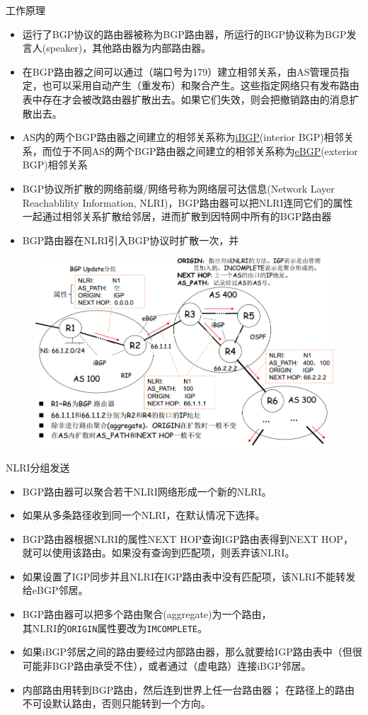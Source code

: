 \myhline
工作原理
\begin{itemize}
\item 运行了BGP协议的路由器被称为BGP路由器，所运行的BGP协议称为BGP发言人(speaker)，其他路由器为内部路由器。
\item 在BGP路由器之间可以通过（端口号为179）建立相邻关系，由AS管理员指定，也可以采用自动产生（重发布）和聚合产生。这些指定网络只有发布路由表中存在才会被改路由器扩散出去。如果它们失效，则会把撤销路由的消息扩散出去。
\item AS内的两个BGP路由器之间建立的相邻关系称为\underline{iBGP}(interior BGP)相邻关系，而位于不同AS的两个BGP路由器之间建立的相邻关系称为\underline{eBGP}(exterior BGP)相邻关系
\item  BGP协议所扩散的网络前缀/网络号称为网络层可达信息(Network Layer Reachablility Information, NLRI)，BGP路由器可以把NLRI连同它们的属性一起通过相邻关系扩散给邻居，进而扩散到因特网中所有的BGP路由器
\item BGP路由器在NLRI引入BGP协议时扩散一次，并
\end{itemize}
\begin{figure}[H]
	\centering
	\includegraphics[width=0.8\linewidth]{fig/NLRI.png}
\end{figure}

\myhline
NLRI分组发送
\begin{itemize}
\item BGP路由器可以聚合若干NLRI网络形成一个新的NLRI。
\item 如果从多条路径收到同一个NLRI，在默认情况下选择。
\item BGP路由器根据NLRI的属性NEXT HOP查询IGP路由表得到NEXT HOP， 就可以使用该路由。如果没有查询到匹配项，则丢弃该NLRI。
\item 如果设置了IGP同步并且NLRI在IGP路由表中没有匹配项，该NLRI不能转发给eBGP邻居。
\item BGP路由器可以把多个路由聚合(aggregate)为一个路由，\\其NLRI的\verb'ORIGIN'属性要改为\verb'IMCOMPLETE'。
\item 如果iBGP邻居之间的路由要经过内部路由器，那么就要给IGP路由表中（但很可能非BGP路由承受不住），或者通过（虚电路）连接iBGP邻居。
\item 内部路由用转到BGP路由，然后连到世界上任一台路由器；
在路径上的路由不可设默认路由，否则只能转到一个方向。
\end{itemize}


